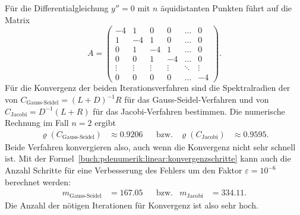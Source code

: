 \begin{beispiel}
Für die Differentialgleichung $y''=0$ mit $n$ äquidistanten Punkten
führt auf die Matrix
\[
A
=
\begin{pmatrix}
    -4&     1&     0&     0& \dots &      0\\
     1&    -4&     1&     0& \dots &      0\\
     0&     1&    -4&     1& \dots &      0\\
     0&     0&     1&    -4& \dots &      0\\[-4pt]
\vdots&\vdots&\vdots&\vdots& \ddots& \vdots\\
     0&     0&     0&     0& \dots &     -4
\end{pmatrix}.
\]
Für die Konvergenz der beiden Iterationsverfahren sind die
Spektralradien der
von $C_{\text{Gauss-Seidel}}=(L+D)^{-1}R$ für das Gauss-Seidel-Verfahren
und
von $C_{\text{Jacobi}}=D^{-1}(L+R)$ für das Jacobi-Verfahren
bestimmen.
Die numerische Rechnung im Fall $n=2$ ergibt
\begin{align*}
\varrho(C_{\text{Gauss-Seidel}})
&\approx
0.9206
&&\text{bzw.}
&
\varrho(C_{\text{Jacobi}})
&\approx
0.9595.
\end{align*}
Beide Verfahren konvergieren also, auch wenn die Konvergenz nicht sehr schnell
ist.
Mit der Formel~\eqref{buch:pdenumerik:linear:konvergenzschritte}
kann auch die Anzahl Schritte für eine Verbesserung des Fehlers um den
Faktor $\varepsilon = 10^{-6}$ berechnet werden:
\begin{align*}
m_{\text{Gauss-Seidel}}
&=
167.05
&&\text{bzw.}&
m_{\text{Jacobi}}
&=
334.11.
\end{align*}
Die Anzahl der nötigen Iterationen für Konvergenz ist also sehr hoch.
\end{beispiel}



